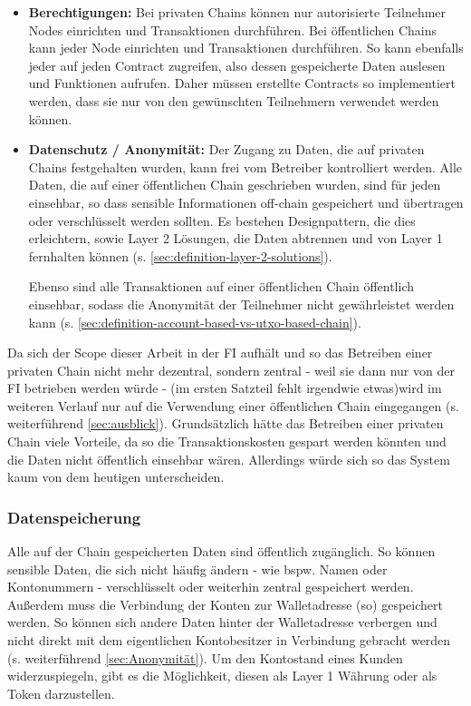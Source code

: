 \documentclass[12pt, a4paper]{article}
\begin{document}
{\begin{itemize}
    Einige Analysen haben gezeigt, dass die Gesamtkosten für den Betrieb einer Anwendung auf einer öffentlichen Chain niedriger sein können als beim Betrieb einer privaten Chain.\footcite[Vgl.][14]{q6}

    \item \textbf{Berechtigungen:}
    Bei privaten Chains können nur autorisierte Teilnehmer Nodes einrichten und Transaktionen durchführen.
    Bei öffentlichen Chains kann jeder Node einrichten und Transaktionen durchführen.
    So kann ebenfalls jeder auf jeden Contract zugreifen, also dessen gespeicherte Daten auslesen und Funktionen aufrufen.
    Daher müssen erstellte Contracts so implementiert werden, dass sie nur von den gewünschten Teilnehmern verwendet werden können.

    \item \textbf{Datenschutz / Anonymität:}
    Der Zugang zu Daten, die auf privaten Chains festgehalten wurden, kann frei vom Betreiber kontrolliert werden. 
    Alle Daten, die auf einer öffentlichen Chain geschrieben wurden, sind für jeden einsehbar, so dass sensible Informationen off-chain gespeichert und übertragen  oder verschlüsselt werden sollten. 
    Es bestehen Designpattern, die dies erleichtern, sowie Layer 2 Lösungen, die Daten abtrennen und von Layer 1 fernhalten können (s. \ref{sec:definition-layer-2-solutions}).

    Ebenso sind alle Transaktionen auf einer öffentlichen Chain öffentlich einsehbar, sodass die Anonymität der Teilnehmer nicht gewährleistet werden kann (s. \ref{sec:definition-account-based-vs-utxo-based-chain}).
\end{itemize}

\noindent
Da sich der Scope dieser Arbeit in der FI aufhält und so das Betreiben einer privaten Chain nicht mehr dezentral, sondern zentral - weil sie dann nur von der FI betrieben werden würde - (im ersten Satzteil fehlt irgendwie etwas)wird im weiteren Verlauf nur auf die Verwendung einer öffentlichen Chain eingegangen (s. weiterführend \ref{sec:ausblick}).
Grundsätzlich hätte das Betreiben einer privaten Chain viele Vorteile, da so die Transaktionskosten gespart werden könnten und die Daten nicht öffentlich einsehbar wären.
Allerdings würde sich so das System kaum von dem heutigen unterscheiden.
\subsubsection{Datenspeicherung}
Alle auf der Chain gespeicherten Daten sind öffentlich zugänglich.
So können sensible Daten, die sich nicht häufig ändern - wie bspw. Namen oder Kontonummern - verschlüsselt oder weiterhin zentral gespeichert werden.
Außerdem muss die Verbindung der Konten zur Walletadresse (so) gespeichert werden. 
So können sich andere Daten hinter der Walletadresse verbergen und nicht direkt mit dem eigentlichen Kontobesitzer in Verbindung gebracht werden (s. weiterführend \ref{sec:Anonymität}).
Um den Kontostand eines Kunden widerzuspiegeln, gibt es die Möglichkeit, diesen als Layer 1 Währung oder als Token darzustellen.

}
\end{document}
